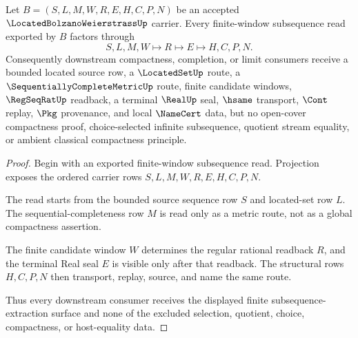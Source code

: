 \begin{theorem}
\label{thm:located-bolzano-weierstrass-finite-window-subsequence}
Let $B=(S,L,M,W,R,E,H,C,P,N)$ be an accepted $\LocatedBolzanoWeierstrassUp$ carrier. Every finite-window subsequence read exported by $B$ factors through
$$
S,L,M,W \longmapsto R \longmapsto E \longmapsto H,C,P,N .
$$
Consequently downstream compactness, completion, or limit consumers receive a bounded located source row, a $\LocatedSetUp$ route, a $\SequentiallyCompleteMetricUp$ route, finite candidate windows, $\RegSeqRatUp$ readback, a terminal $\RealUp$ seal, $\hsame$ transport, $\Cont$ replay, $\Pkg$ provenance, and local $\NameCert$ data, but no open-cover compactness proof, choice-selected infinite subsequence, quotient stream equality, or ambient classical compactness principle.
\end{theorem}
\begin{proof}
Begin with an exported finite-window subsequence read. Projection exposes the ordered carrier rows $S,L,M,W,R,E,H,C,P,N$.

The read starts from the bounded source sequence row $S$ and located-set row $L$. The sequential-completeness row $M$ is read only as a metric route, not as a global compactness assertion.

The finite candidate window $W$ determines the regular rational readback $R$, and the terminal Real seal $E$ is visible only after that readback. The structural rows $H,C,P,N$ then transport, replay, source, and name the same route.

Thus every downstream consumer receives the displayed finite subsequence-extraction surface and none of the excluded selection, quotient, choice, compactness, or host-equality data.
\end{proof}


\begin{closurestatus}{\LocatedBolzanoWeierstrassUp}
  \theoryclosure{\seedClosure}
  \formalstatus{\unformalizedV}
\end{closurestatus}
